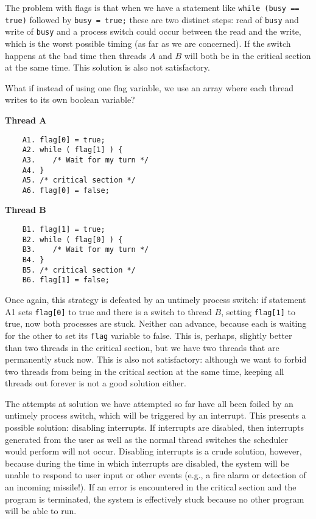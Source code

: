 The problem with flags is that when we have a statement like \texttt{while (busy == true)} followed by \texttt{busy = true;} these are two distinct steps: read of \texttt{busy} and write of \texttt{busy} and a process switch could occur between the read and the write, which is the worst possible timing (as far as we are concerned). If the switch happens at the bad time then threads $A$ and $B$ will both be in the critical section at the same time. This solution is also not satisfactory.

What if instead of using one flag variable, we use an array where each thread writes to its own boolean variable?

\begin{multicols}{2}
	\textbf{Thread A}\vspace{-2em}
	\begin{verbatim}
	A1. flag[0] = true;
	A2. while ( flag[1] ) {
	A3.    /* Wait for my turn */
	A4. }
	A5. /* critical section */
	A6. flag[0] = false;
	\end{verbatim}
	\columnbreak
	\textbf{Thread B}\vspace{-2em}
	\begin{verbatim}
	B1. flag[1] = true;
	B2. while ( flag[0] ) {
	B3.    /* Wait for my turn */
	B4. }
	B5. /* critical section */
	B6. flag[1] = false;
	\end{verbatim}
\end{multicols}

Once again, this strategy is defeated by an untimely process switch: if statement A1 sets \texttt{flag[0]} to true and there is a switch to thread $B$, setting \texttt{flag[1]} to true, now both processes are stuck. Neither can advance, because each is waiting for the other to set its \texttt{flag} variable to false. This is, perhaps, slightly better than two threads in the critical section, but we have two threads that are permanently stuck now. This is also not satisfactory: although we want to forbid two threads from being in the critical section at the same time, keeping all threads out forever is not a good solution either.

The attempts at solution we have attempted so far have all been foiled by an untimely process switch, which will be triggered by an interrupt. This presents a possible solution: disabling interrupts. If interrupts are disabled, then interrupts generated from the user as well as the normal thread switches the scheduler would perform will not occur. Disabling interrupts is a crude solution, however, because during the time in which interrupts are disabled, the system will be unable to respond to user input or other events (e.g., a fire alarm or detection of an incoming missile!). If an error is encountered in the critical section and the program is terminated, the system is effectively stuck because no other program will be able to run.

